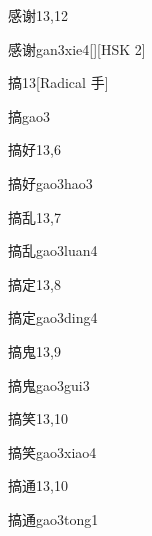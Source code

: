 \begin{entry}{感谢}{13,12}
  \begin{phonetics}{感谢}{gan3xie4}[][HSK 2]
  \end{phonetics}
\end{entry}

\begin{entry}{搞}{13}[Radical 手]
  \begin{phonetics}{搞}{gao3}
  \end{phonetics}
\end{entry}

\begin{entry}{搞好}{13,6}
  \begin{phonetics}{搞好}{gao3hao3}
  \end{phonetics}
\end{entry}

\begin{entry}{搞乱}{13,7}
  \begin{phonetics}{搞乱}{gao3luan4}
  \end{phonetics}
\end{entry}

\begin{entry}{搞定}{13,8}
  \begin{phonetics}{搞定}{gao3ding4}
  \end{phonetics}
\end{entry}

\begin{entry}{搞鬼}{13,9}
  \begin{phonetics}{搞鬼}{gao3gui3}
  \end{phonetics}
\end{entry}

\begin{entry}{搞笑}{13,10}
  \begin{phonetics}{搞笑}{gao3xiao4}
  \end{phonetics}
\end{entry}

\begin{entry}{搞通}{13,10}
  \begin{phonetics}{搞通}{gao3tong1}
  \end{phonetics}
\end{entry}

